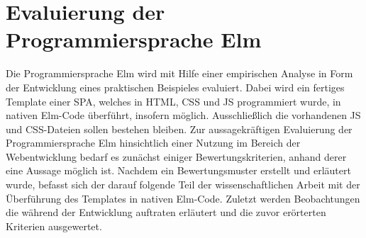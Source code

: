 \chapter{Evaluierung der Programmiersprache Elm}
\label{sec:Evaluierung der Programmiersprache Elm}
Die Programmiersprache Elm wird mit Hilfe einer empirischen Analyse in Form der Entwicklung eines praktischen Beispieles evaluiert. Dabei wird ein fertiges Template einer \ac{SPA}, welches in \ac{HTML}, \ac{CSS} und \ac{JS} programmiert wurde, in nativen Elm-Code überführt, insofern möglich. Ausschließlich die vorhandenen \ac{JS} und \ac{CSS}-Dateien sollen bestehen bleiben. Zur aussagekräftigen Evaluierung der Programmiersprache Elm hinsichtlich einer Nutzung im Bereich der Webentwicklung bedarf es zunächst einiger Bewertungskriterien, anhand derer eine Aussage möglich ist. Nachdem ein Bewertungsmuster erstellt und erläutert wurde, befasst sich der darauf folgende Teil der wissenschaftlichen Arbeit mit der Überführung des Templates in nativen Elm-Code. Zuletzt werden Beobachtungen die während der Entwicklung auftraten erläutert und die zuvor erörterten Kriterien ausgewertet.

